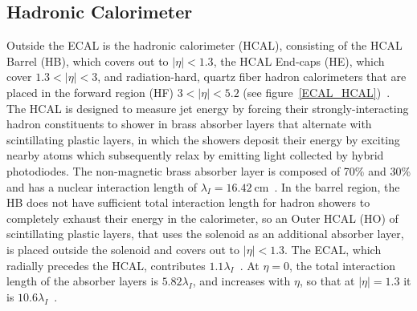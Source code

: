\subsection{Hadronic Calorimeter}
Outside the ECAL is the hadronic calorimeter (HCAL), consisting of the HCAL Barrel (HB), which covers out to $\vert \eta \vert < 1.3$, the HCAL End-caps (HE), which cover $1.3 < \vert \eta \vert < 3$, and radiation-hard, quartz fiber hadron calorimeters that are placed in the forward region (HF) $3 < \vert \eta \vert < 5.2$ (see figure~\ref{ECAL_HCAL})~\cite{Bayatian:922757}.
The HCAL is designed to measure jet energy by forcing their strongly-interacting hadron constituents to shower in brass absorber layers that alternate with scintillating plastic layers, in which the showers deposit their energy by exciting nearby atoms which subsequently relax by emitting light collected by hybrid photodiodes.
The non-magnetic brass absorber layer is composed of 70\%  and 30\%  and has a nuclear interaction length of $\lambda_I = \SI{16.42}{\cm}$~\cite{Chatrchyan:1129810}.
In the barrel region, the HB does not have sufficient total interaction length for hadron showers to completely exhaust their energy in the calorimeter, so an Outer HCAL (HO) of scintillating plastic layers, that uses the solenoid as an additional absorber layer, is placed outside the solenoid and covers out to $\vert \eta \vert < 1.3$.
The ECAL, which radially precedes the HCAL, contributes $1.1\lambda_I$~\cite{Chatrchyan:1129810}.
At $\eta = 0$, the total interaction length of the absorber layers is $5.82\lambda_I$, and increases with $\eta$, so that at $\vert \eta \vert = 1.3$ it is $10.6\lambda_I$~\cite{Chatrchyan:1129810}.

